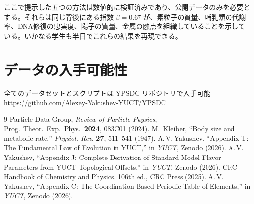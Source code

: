 \documentclass[12pt,a4paper]{article}
\begin{document}
	ここで提示した五つの方法は数値的に検証済みであり、公開データのみを必要とする。それらは同じ背後にある指数 \(\beta = 0.67\) が、素粒子の質量、哺乳類の代謝率、DNA修復の忠実度、陽子の質量、金属の融点を組織していることを示している。いかなる学生も半日でこれらの結果を再現できる。
	
	\section*{データの入手可能性}
	全てのデータセットとスクリプトは YPSDC リポジトリで入手可能\\
	\url{https://github.com/Alexey-Yakushev-YUCT/YPSDC}
	
	\begin{thebibliography}{9}
		 Particle Data Group, \emph{Review of Particle Physics},
		Prog.\ Theor.\ Exp.\ Phys.\ \textbf{2024}, 083C01 (2024).
		 M.~Kleiber, ``Body size and metabolic rate,''
		\emph{Physiol. Rev.} \textbf{27}, 511--541 (1947).
		 A.\,V.\,Yakushev, ``Appendix T: The Fundamental Law
		of Evolution in YUCT,'' in \emph{YUCT}, Zenodo (2026).
		 A.\,V.\,Yakushev, ``Appendix J: Complete Derivation of
		Standard Model Flavor Parameters from YUCT Topological
		Offsets,'' in \emph{YUCT}, Zenodo (2026).
		 CRC Handbook of Chemistry and Physics, 106th ed.,
		CRC Press (2025).
		 A.\,V.\,Yakushev, ``Appendix C: The Coordination‑Based
		Periodic Table of Elements,'' in \emph{YUCT}, Zenodo (2026).
	\end{thebibliography}
	
\end{document}
